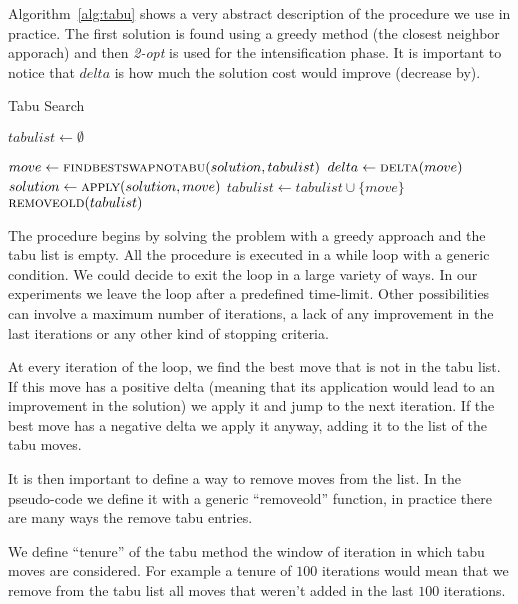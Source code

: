 \documentclass{article}
\begin{document}
Algorithm~\ref{alg:tabu} shows a very abstract description of the procedure we use in practice. The first solution is found using a greedy method (the closest neighbor apporach) and then \textit{2-opt} is used for the intensification phase. It is important to notice that $delta$ is
how much the solution cost would improve (decrease by).

\begin{algorithm}[h]
\caption{Tabu Search}
\label{alg:tabu}
\begin{algorithmic}
    \State{}
    \State $tabulist \gets \emptyset$

        \State $move \gets \Call{findbestswapnotabu}{solution, tabulist}$
        \State $delta \gets \Call{delta}{move}$
        \State $solution \gets \Call{apply}{solution, move}$
          \State $tabulist \gets tabulist \cup \{move\}$
        \EndIf
        \State $\Call{removeold}{tabulist}$
    \EndWhile

  \EndProcedure

\end{algorithmic}
\end{algorithm}

The procedure begins by solving the problem with a greedy approach and the tabu list
is empty. All the procedure is executed in a while loop with a generic condition. We could
decide to exit the loop in a large variety of ways. In our experiments we leave the loop
after a predefined time-limit. Other possibilities can involve a maximum number of iterations, a lack of any improvement in the last iterations or any other kind of stopping criteria.

At every iteration of the loop, we find the best move that is not in the tabu list. If this move has a positive delta (meaning that its application would lead to an
improvement in the solution) we apply it and jump to the next iteration. If the best
move has a negative delta we apply it anyway, adding it to the list of the tabu moves.

It is then important to define a way to remove moves from the list. In the pseudo-code we define it with a generic ``removeold'' function, in practice there are many ways the remove tabu entries.

We define ``tenure'' of the tabu method the window of iteration in which tabu moves are considered. For example a tenure of $100$ iterations would mean that we remove
from the tabu list all moves that weren't added in the last $100$ iterations.
\end{document}
